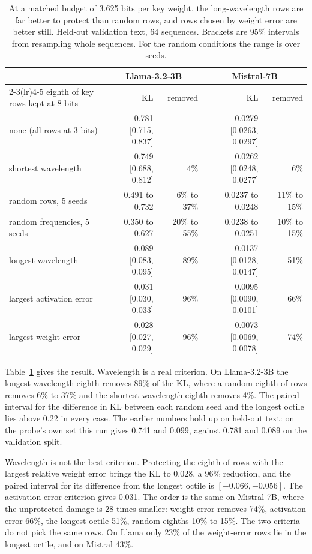 \documentclass[journal]{IEEEtran}
\newcommand{\KL}{\mathrm{KL}}
\begin{document}
\begin{table}[t]
\centering
\caption{At a matched budget of 3.625 bits per key weight, the long-wavelength rows are far better
to protect than random rows, and rows chosen by weight error are better still. Held-out
validation text, 64 sequences. Brackets are 95\% intervals from resampling whole sequences. For
the random conditions the range is over seeds.}
\label{tab:protect}
\small
\begin{tabular}{lrrrr}
\toprule
 & \multicolumn{2}{c}{Llama-3.2-3B} & \multicolumn{2}{c}{Mistral-7B} \\
\cmidrule(lr){2-3}\cmidrule(lr){4-5}
eighth of key rows kept at 8 bits & $\KL$ & removed & $\KL$ & removed \\
\midrule
none (all rows at 3 bits) & 0.781 [0.715, 0.837] & & 0.0279 [0.0263, 0.0297] & \\
shortest wavelength & 0.749 [0.688, 0.812] & 4\% & 0.0262 [0.0248, 0.0277] & 6\% \\
random rows, 5 seeds & 0.491 to 0.732 & 6\% to 37\% & 0.0237 to 0.0248 & 11\% to 15\% \\
random frequencies, 5 seeds & 0.350 to 0.627 & 20\% to 55\% & 0.0238 to 0.0251 & 10\% to 15\% \\
longest wavelength & 0.089 [0.083, 0.095] & 89\% & 0.0137 [0.0128, 0.0147] & 51\% \\
largest activation error & 0.031 [0.030, 0.033] & 96\% & 0.0095 [0.0090, 0.0101] & 66\% \\
largest weight error & 0.028 [0.027, 0.029] & 96\% & 0.0073 [0.0069, 0.0078] & 74\% \\
\bottomrule
\end{tabular}
\end{table}

Table~\ref{tab:protect} gives the result. Wavelength is a real criterion. On Llama-3.2-3B the
longest-wavelength eighth removes 89\% of the KL, where a random eighth of rows removes 6\% to
37\% and the shortest-wavelength eighth removes 4\%. The paired interval for the difference in
KL between each random seed and the longest octile lies above 0.22 in every case. The earlier
numbers hold up on held-out text: on the probe's own set this run gives 0.741 and 0.099, against
0.781 and 0.089 on the validation split.

Wavelength is not the best criterion. Protecting the eighth of rows with the largest relative
weight error brings the KL to 0.028, a 96\% reduction, and the paired interval for its difference
from the longest octile is $[-0.066, -0.056]$. The activation-error criterion gives 0.031. The
order is the same on Mistral-7B, where the unprotected damage is 28 times smaller: weight error
removes 74\%, activation error 66\%, the longest octile 51\%, random eighths 10\% to 15\%. The two
criteria do not pick the same rows. On Llama only 23\% of the weight-error rows lie in the longest
octile, and on Mistral 43\%.
\end{document}
